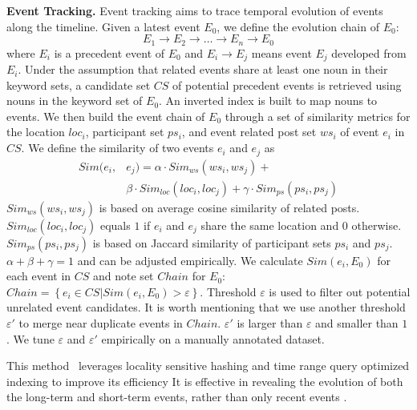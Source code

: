 \noindent\textbf{Event Tracking.}
\label{tracing}
Event tracking aims to trace temporal evolution of events along the timeline.
Given a latest event $E_{0}$, we define the evolution chain of $E_{0}$:
\begin{equation}
E_{1}\rightarrow E_{2}\rightarrow\ldots\rightarrow E_{n}\rightarrow E_{0}
\end{equation}
where $E_{i}$ is a precedent event of $E_{0}$ and $E_{i}\rightarrow E_{j}$ means event $E_{j}$ developed from $E_{i}$.
Under the assumption that related events share at least one noun in their keyword sets,
a candidate set $CS$ of potential precedent events is retrieved using nouns in the keyword set of $E_{0}$.
An inverted index is built to map nouns to events.
We then build the event chain of $E_{0}$ through a set of similarity metrics for
the location $loc_{i}$, participant set $ps_{i}$, and event related post set $ws_{i}$
of event $e_{i}$ in $CS$.
We define the similarity of two events $e_{i}$ and $e_{j}$ as
\begin{equation}
\begin{aligned}
Sim(e_{i}, &e_{j})=\alpha\cdot Sim_{ws}(ws_{i},ws_{j}) + \\& \beta\cdot Sim_{loc}(loc_{i},loc_{j})
+ \gamma\cdot Sim_{ps}(ps_{i},ps_{j})
\end{aligned}
\end{equation}
$Sim_{ws}(ws_{i},ws_{j})$ is based on average cosine similarity of related posts.
$Sim_{loc}(loc_{i},loc_{j})$ equals $1$ if $e_{i}$ and $e_{j}$ share the same location and 0 otherwise.
$Sim_{ps}(ps_{i},ps_{j})$ is based on Jaccard similarity of participant sets $ps_{i}$ and $ps_{j}$.
$\alpha+\beta+\gamma=1$ and can be adjusted empirically.
We calculate $Sim(e_{i}, E_{0})$ for each event in $CS$ and note set $Chain$ for $E_{0}$:
$Chain=\left\{ e_{i} \in CS | Sim(e_{i}, E_{0}) > \varepsilon \right\}$.
Threshold $\varepsilon$ is used to filter out potential unrelated event candidates.
It is worth mentioning that we use another threshold $\varepsilon '$ to merge near duplicate events in $Chain$.
$\varepsilon '$ is larger than $\varepsilon$ and smaller than $1$.
We tune $\varepsilon$ and $\varepsilon '$ empirically on a manually annotated dataset.

This method~\cite{lu2015discovering} leverages locality sensitive hashing and time range query optimized indexing to improve its efficiency
It is effective in revealing the evolution of both the long-term and short-term events,
rather than only recent events \cite{lee2014cast, saha2012learning}.

